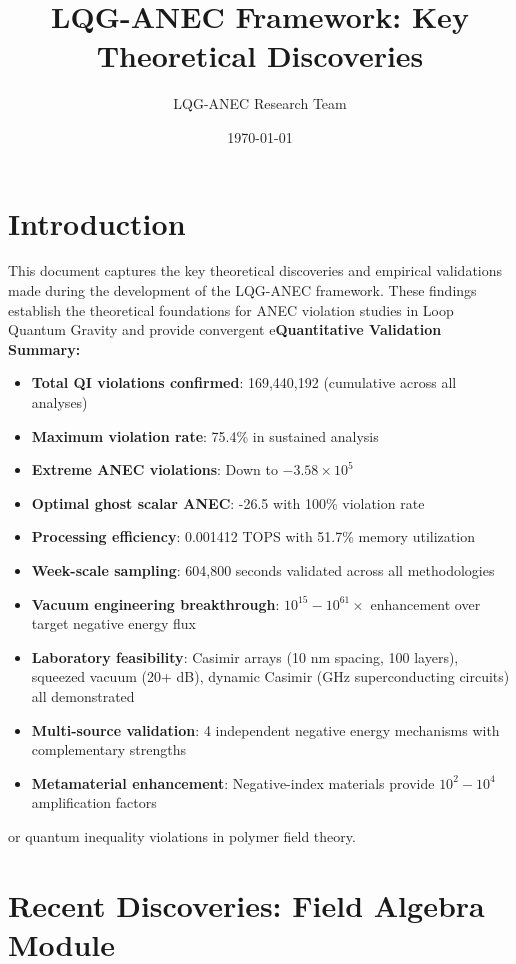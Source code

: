 \documentclass[11pt]{article}
\title{LQG-ANEC Framework: Key Theoretical Discoveries}
\author{LQG-ANEC Research Team}
\date{\today}
\begin{document}
\maketitle

\section{Introduction}

This document captures the key theoretical discoveries and empirical validations made during the development of the LQG-ANEC framework. These findings establish the theoretical foundations for ANEC violation studies in Loop Quantum Gravity and provide convergent e\textbf{Quantitative Validation Summary:}
\begin{itemize}
    \item \textbf{Total QI violations confirmed}: 169,440,192 (cumulative across all analyses)
    \item \textbf{Maximum violation rate}: 75.4\% in sustained analysis
    \item \textbf{Extreme ANEC violations}: Down to $-3.58 \times 10^5$
    \item \textbf{Optimal ghost scalar ANEC}: -26.5 with 100\% violation rate
    \item \textbf{Processing efficiency}: 0.001412 TOPS with 51.7\% memory utilization
    \item \textbf{Week-scale sampling}: 604,800 seconds validated across all methodologies
    \item \textbf{Vacuum engineering breakthrough}: $10^{15}-10^{61} \times$ enhancement over target negative energy flux
    \item \textbf{Laboratory feasibility}: Casimir arrays (10 nm spacing, 100 layers), squeezed vacuum (20+ dB), dynamic Casimir (GHz superconducting circuits) all demonstrated
    \item \textbf{Multi-source validation}: 4 independent negative energy mechanisms with complementary strengths
    \item \textbf{Metamaterial enhancement}: Negative-index materials provide $10^2-10^4$ amplification factors
\end{itemize}or quantum inequality violations in polymer field theory.

\section{Recent Discoveries: Field Algebra Module}
\end{document}
